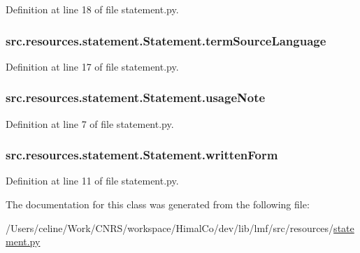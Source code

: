 Definition at line 18 of file statement.\+py.

\hypertarget{classsrc_1_1resources_1_1statement_1_1_statement_a89ee2dec5b458b252254877fa54f899c}{
\subsubsection[{term\+Source\+Language}]{\setlength{\rightskip}{0pt plus 5cm}src.\+resources.\+statement.\+Statement.\+term\+Source\+Language}}\label{classsrc_1_1resources_1_1statement_1_1_statement_a89ee2dec5b458b252254877fa54f899c}


Definition at line 17 of file statement.\+py.

\hypertarget{classsrc_1_1resources_1_1statement_1_1_statement_afdefc898083509fe10cf5329c341e691}{
\subsubsection[{usage\+Note}]{\setlength{\rightskip}{0pt plus 5cm}src.\+resources.\+statement.\+Statement.\+usage\+Note}}\label{classsrc_1_1resources_1_1statement_1_1_statement_afdefc898083509fe10cf5329c341e691}


Definition at line 7 of file statement.\+py.

\hypertarget{classsrc_1_1resources_1_1statement_1_1_statement_a95875344cd0ffd2a2fe81569114cb7d6}{
\subsubsection[{written\+Form}]{\setlength{\rightskip}{0pt plus 5cm}src.\+resources.\+statement.\+Statement.\+written\+Form}}\label{classsrc_1_1resources_1_1statement_1_1_statement_a95875344cd0ffd2a2fe81569114cb7d6}


Definition at line 11 of file statement.\+py.



The documentation for this class was generated from the following file\+:\begin{DoxyCompactItemize}
\item 
/\+Users/celine/\+Work/\+C\+N\+R\+S/workspace/\+Himal\+Co/dev/lib/lmf/src/resources/\hyperlink{resources_2statement_8py}{statement.\+py}\end{DoxyCompactItemize}

